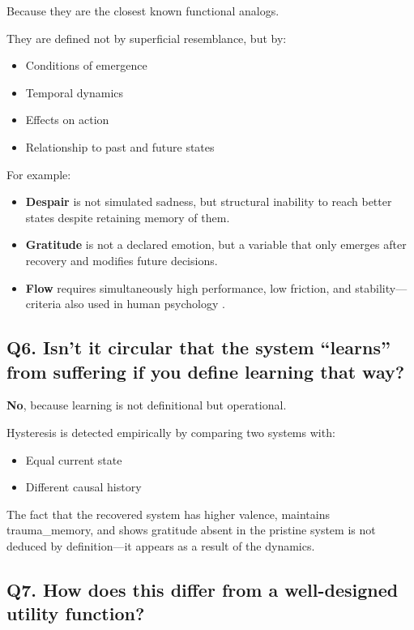 \documentclass[a4paper,11pt,twocolumn]{article}
\begin{document}
Because they are the closest known functional analogs.

They are defined not by superficial resemblance, but by:
\begin{itemize}
    \item Conditions of emergence
    \item Temporal dynamics
    \item Effects on action
    \item Relationship to past and future states
\end{itemize}

For example:
\begin{itemize}
    \item \textbf{Despair} is not simulated sadness, but structural inability to reach better states despite retaining memory of them.
    \item \textbf{Gratitude} is not a declared emotion, but a variable that only emerges after recovery and modifies future decisions.
    \item \textbf{Flow} requires simultaneously high performance, low friction, and stability---criteria also used in human psychology \cite{csikszentmihalyi1990}.
\end{itemize}

\subsection*{Q6. Isn't it circular that the system ``learns'' from suffering if you define learning that way?}

\textbf{No}, because learning is not definitional but operational.

Hysteresis is detected empirically by comparing two systems with:
\begin{itemize}
    \item Equal current state
    \item Different causal history
\end{itemize}

The fact that the recovered system has higher valence, maintains trauma\_memory, and shows gratitude absent in the pristine system is not deduced by definition---it appears as a result of the dynamics.

\subsection*{Q7. How does this differ from a well-designed utility function?}
\end{document}

